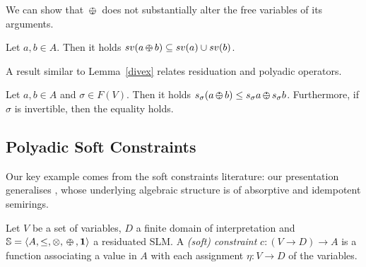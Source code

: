 \documentclass{llncs}
\def\monid{{\mathbf 0}}
\def\monop{\otimes}
\def\odiv{\, {\ominus\hspace{-7.7pt} \div} \,}
\def\monid{\mathbf{1}}
\begin{document}
We can show that $\odiv$ does not substantially alter the free variables of its arguments.

\begin{lemma}
Let $a, b \in A$. Then it holds $sv(a \odiv b) \subseteq sv(a) \cup sv(b)$. 
\end{lemma}



%

A result similar to Lemma~\ref{divex} relates residuation and polyadic operators.


\begin{lemma}
Let $a, b \in A$ and $\sigma \in F(V)$. Then it holds
$s_\sigma (a \odiv b) \leq s_\sigma a \odiv s_\sigma b$.
Furthermore, if $\sigma$ is invertible, then the equality holds.
\end{lemma}

\subsection{Polyadic Soft Constraints}\label{sec:softconstraints}
\label{subsec:inst} 
Our key example comes from the soft constraints literature: 
our presentation generalises \cite{scc},
whose underlying algebraic structure is of absorptive and idempotent semirings.

\begin{definition}\label{def:softconstraints}
	Let $V$ be a set of variables, $D$ a finite domain of interpretation
	and ${\mathbb S} = \langle A, \leq, \monop, \odiv, \monid \rangle$ a residuated SLM.
	A \emph{(soft) constraint} $c: (V \rightarrow D) \rightarrow
	A$ is a function associating a value in $A$ with each assignment
	$\eta: V\rightarrow D$ of the variables.
\end{definition}
\end{document}
